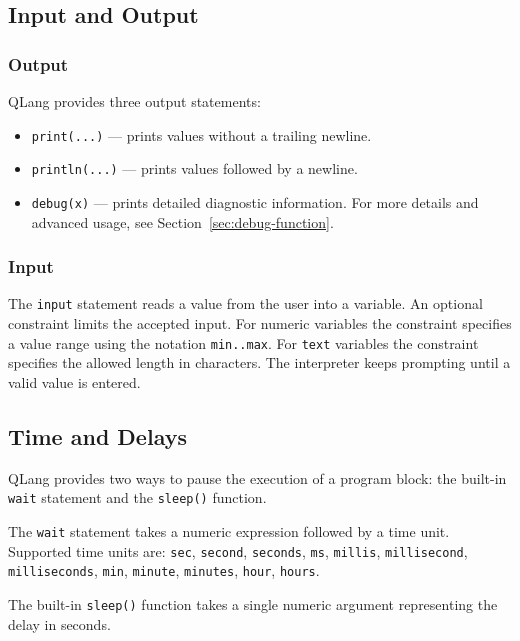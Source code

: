 \subsection{Input and Output}\label{sec:io}

\subsubsection{Output}

QLang provides three output statements:

\begin{itemize}
    \item \texttt{print(...)} — prints values without a trailing newline.
    \item \texttt{println(...)} — prints values followed by a newline.
    \item \texttt{debug(x)} — prints detailed diagnostic information. For more details and advanced usage, see Section~\ref{sec:debug-function}.
\end{itemize}



\subsubsection{Input}

The \texttt{input} statement reads a value from the user into a variable.
An optional constraint limits the accepted input. For numeric variables
the constraint specifies a value range using the notation \texttt{min..max}.
For \texttt{text} variables the constraint specifies the allowed length in
characters. The interpreter keeps prompting until a valid value is entered.



\newpage
\subsection{Time and Delays}\label{sec:time-delays}

QLang provides two ways to pause the execution of a program block: the built-in \texttt{wait} statement and the \texttt{sleep()} function. 

The \texttt{wait} statement takes a numeric expression followed by a time unit. Supported time units are: \texttt{sec}, \texttt{second}, \texttt{seconds}, \texttt{ms}, \texttt{millis}, \texttt{millisecond}, \texttt{milliseconds}, \texttt{min}, \texttt{minute}, \texttt{minutes}, \texttt{hour}, \texttt{hours}.

The built-in \texttt{sleep()} function takes a single numeric argument representing the delay in seconds.


